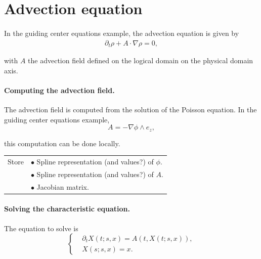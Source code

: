 \documentclass[presentation.tex]{subfiles}
\begin{document}
\section{Advection equation}
\paragraph{}
In the guiding center equations example, the advection equation is given by 
\begin{equation}
\begin{aligned}
	\partial_t \rho + A\cdot\nabla \rho = 0,
\end{aligned}
\end{equation}

with $A$ the advection field defined on the logical domain on the physical domain axis. 


\paragraph{Computing the advection field.}
The advection field is computed from the solution of the Poisson equation. In the guiding center equations example,
\begin{equation}
	A = - \nabla \phi \wedge e_z,
\end{equation}

this computation can be done locally. 


\begin{center}
\begin{tabular}{ |l|l| } 
 \hline
 Store 	& $\bullet$ Spline representation (and values?) of $\phi$. \\
 		& $\bullet$ Spline representation (and values?) of $A$. \\
  		& $\bullet$ Jacobian matrix. \\
 \hline
\end{tabular}
\end{center}


\paragraph{Solving the characteristic equation. }
The equation to solve is 
\begin{equation}
\left\{
\begin{aligned}
	& \partial_t X(t; s, x)  = A(t,X(t; s, x)), \\
	& X(s; s, x) = x.
\end{aligned}
\right.
\end{equation}
\end{document}
